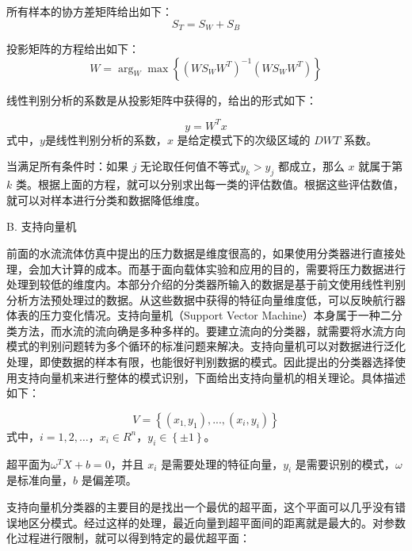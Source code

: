 所有样本的协方差矩阵给出如下：
 \begin{equation}
{S_T} = {S_W} + {S_B}
\label{eq:chap3:21}
\end{equation}

投影矩阵的方程给出如下：
\begin{equation}
W = {\arg _W}\max \left\{ {{{\left( {W{S_W}{W^T}} \right)}^{ - 1}}\left( {W{S_W}{W^T}} \right)} \right\}
\label{eq:chap3:22}
\end{equation}

线性判别分析的系数是从投影矩阵中获得的，给出的形式如下：

\begin{equation}
y = {W^T}x
\label{eq:chap3:23}
\end{equation}
式中，$y$是线性判别分析的系数，$x$ 是给定模式下的次级区域的 $DWT$ 系数。

当满足所有条件时：如果 $j$ 无论取任何值不等式$y_k>y_j$ 都成立，那么 $x$ 就属于第 $k$ 类。根据上面的方程，就可以分别求出每一类的评估数值。根据这些评估数值，就可以对样本进行分类和数据降低维度。

B. {支持向量机 }

前面的水流流体仿真中提出的压力数据是维度很高的，如果使用分类器进行直接处理，会加大计算的成本。而基于面向载体实验和应用的目的，需要将压力数据进行处理到较低的维度内。本部分介绍的分类器所输入的数据是基于前文使用线性判别分析方法预处理过的数据。从这些数据中获得的特征向量维度低，可以反映航行器体表的压力变化情况。支持向量机（Support Vector Machine）本身属于一种二分类方法，而水流的流向确是多种多样的。要建立流向的分类器，就需要将水流方向模式的判别问题转为多个循环的标准问题来解决。支持向量机可以对数据进行泛化处理，即使数据的样本有限，也能很好判别数据的模式。因此提出的分类器选择使用支持向量机来进行整体的模式识别，下面给出支持向量机的相关理论。具体描述如下：

\begin{equation}
V = \left\{ {\left( {{x_{1,}}{y_1}} \right),...,\left( {{x_i},{y_i}} \right)} \right\}
\label{eq:chap3:24}
\end{equation}
式中，$i=1,2,\ldots$，${x_i} \in {R^n}$，${y_i} \in \left\{ { \pm 1} \right\}$。

超平面为${\omega ^T}X + b = 0$，并且 $x_i$ 是需要处理的特征向量，$y_i$ 是需要识别的模式，$\omega$ 是标准向量，$b$ 是偏差项。

支持向量机分类器的主要目的是找出一个最优的超平面，这个平面可以几乎没有错误地区分模式。经过这样的处理，最近向量到超平面间的距离就是最大的。对参数化过程进行限制，就可以得到特定的最优超平面：

